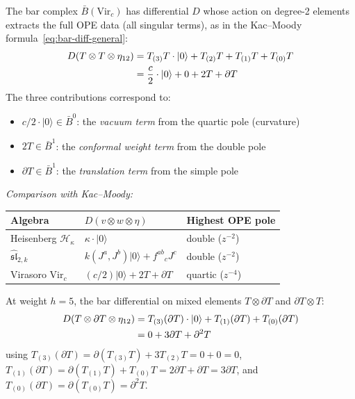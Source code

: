 \begin{computation}\label{comp:virasoro-bar-diff}
The bar complex $\bar{B}(\mathrm{Vir}_c)$ has differential $D$ whose action on degree-2 elements extracts the full OPE data (all singular terms), as in the Kac--Moody formula~\eqref{eq:bar-diff-general}:
\begin{align}
D(T \otimes T \otimes \eta_{12}) &= T_{(3)}T \cdot |0\rangle + T_{(2)}T + T_{(1)}T + T_{(0)}T \notag \\
&= \frac{c}{2}\cdot|0\rangle + 0 + 2T + \partial T \end{align}
The three contributions correspond to:
\begin{itemize}
\item $c/2\cdot|0\rangle \in \bar{B}^0$: the \emph{vacuum term} from the quartic pole (curvature)
\item $2T \in \bar{B}^1$: the \emph{conformal weight term} from the double pole
\item $\partial T \in \bar{B}^1$: the \emph{translation term} from the simple pole
\end{itemize}

\emph{Comparison with Kac--Moody:}
\begin{center}
\begin{tabular}{lll}
\textbf{Algebra} & \textbf{$D(v \otimes w \otimes \eta)$} & \textbf{Highest OPE pole} \\
\hline
Heisenberg $\mathcal{H}_\kappa$ & $\kappa\cdot|0\rangle$ & double ($z^{-2}$) \\
$\widehat{\mathfrak{sl}}_{2,k}$ & $k(J^a,J^b)|0\rangle + f^{ab}{}_c J^c$ & double ($z^{-2}$) \\
Virasoro $\mathrm{Vir}_c$ & $(c/2)|0\rangle + 2T + \partial T$ & quartic ($z^{-4}$)
\end{tabular}
\end{center}

At weight $h = 5$, the bar differential on mixed elements $T \otimes \partial T$ and $\partial T \otimes T$:
\begin{align}
D(T \otimes \partial T \otimes \eta_{12}) &= T_{(3)}(\partial T) \cdot |0\rangle + T_{(1)}(\partial T) + T_{(0)}(\partial T) \notag \\
&= 0 + 3\partial T + \partial^2 T \end{align}
using $T_{(3)}(\partial T) = \partial(T_{(3)}T) + 3 T_{(2)}T = 0 + 0 = 0$, $T_{(1)}(\partial T) = \partial(T_{(1)}T) + T_{(0)}T = 2\partial T + \partial T = 3\partial T$, and $T_{(0)}(\partial T) = \partial(T_{(0)}T) = \partial^2 T$.
\end{computation}

